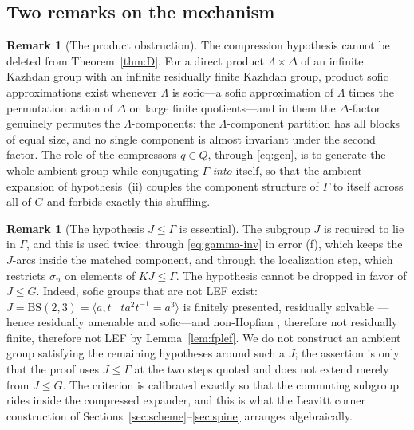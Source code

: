 \documentclass[11pt]{amsart}
\theoremstyle{definition}
\newtheorem{remark}[theorem]{Remark}
\theoremstyle{plain}
\begin{document}
\subsection{Two remarks on the mechanism}

\begin{remark}[The product obstruction]\label{rem:product}
The compression hypothesis cannot be deleted from Theorem~\ref{thm:D}.  For a direct product \(\Lambda\times\Delta\) of an infinite Kazhdan group with an infinite residually finite Kazhdan group, product sofic approximations exist whenever \(\Lambda\) is sofic---a sofic approximation of \(\Lambda\) times the permutation action of \(\Delta\) on large finite quotients---and in them the \(\Delta\)-factor genuinely permutes the \(\Lambda\)-components: the \(\Lambda\)-component partition has all blocks of equal size, and no single component is almost invariant under the second factor.  The role of the compressors \(q\in Q\), through \eqref{eq:gen}, is to generate the whole ambient group while conjugating \(\Gamma\) \emph{into} itself, so that the ambient expansion of hypothesis~(ii) couples the component structure of \(\Gamma\) to itself across all of \(G\) and forbids exactly this shuffling.
\end{remark}

\begin{remark}[The hypothesis \(J\leq\Gamma\) is essential]\label{rem:JinGamma-role}
The subgroup \(J\) is required to lie in \(\Gamma\), and this is used twice: through \eqref{eq:gamma-inv} in error (f), which keeps the \(J\)-arcs inside the matched component, and through the localization step, which restricts \(\sigma_n\) on elements of \(KJ\leq\Gamma\).  The hypothesis cannot be dropped in favor of \(J\leq G\).  Indeed, sofic groups that are not LEF exist: \(J=\mathrm{BS}(2,3)=\langle a,t\mid ta^2t^{-1}=a^3\rangle\) is finitely presented, residually solvable \cite{Kropholler90}---hence residually amenable and sofic---and non-Hopfian \cite{BaumslagSolitar62}, therefore not residually finite, therefore not LEF by Lemma~\ref{lem:fplef}.  We do not construct an ambient group satisfying the remaining hypotheses around such a \(J\); the assertion is only that the proof uses \(J\leq\Gamma\) at the two steps quoted and does not extend merely from \(J\leq G\).  The criterion is calibrated exactly so that the commuting subgroup rides inside the compressed expander, and this is what the Leavitt corner construction of Sections~\ref{sec:scheme}--\ref{sec:spine} arranges algebraically.
\end{remark}
\end{document}
